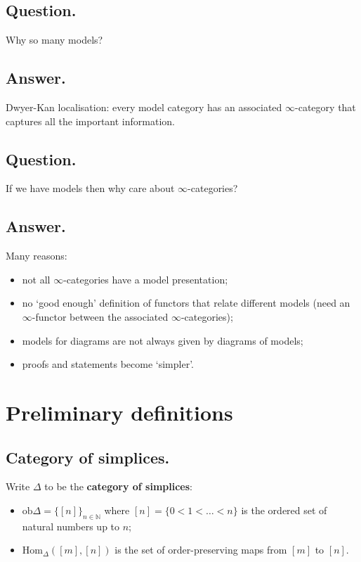 \documentclass{article}
\numberwithin{equation}{subsection}
\renewcommand{\ss}[1]{\subsection{#1}}
\newcommand{\Hom}{\mathrm{Hom}}
\begin{document}
        \ss{Question.}
            Why so many models?

        \ss{Answer.}
            Dwyer-Kan localisation: every model category has an associated $\infty$-category that captures all the important information.

        \ss{Question.}
            If we have models then why care about $\infty$-categories?

        \ss{Answer.}
            Many reasons:
            \begin{itemize}
                \item not all $\infty$-categories have a model presentation;
                \item no `good enough' definition of functors that relate different models (need an $\infty$-functor between the associated $\infty$-categories);
                \item models for diagrams are not always given by diagrams of models;
                \item proofs and statements become `simpler'.
            \end{itemize}

    \section{Preliminary definitions}

        \ss{Category of simplices.}
            Write $\Delta$ to be the \textbf{category of simplices}:
            \begin{itemize}
                \item $\mathrm{ob}\Delta = \{[n]\}_{n\in\mathbb{N}}$ where $[n]=\{0<1<\ldots<n\}$ is the ordered set of natural numbers up to $n$;
                \item $\Hom_\Delta([m],[n])$ is the set of order-preserving maps from $[m]$ to $[n]$.
            \end{itemize}
\end{document}
